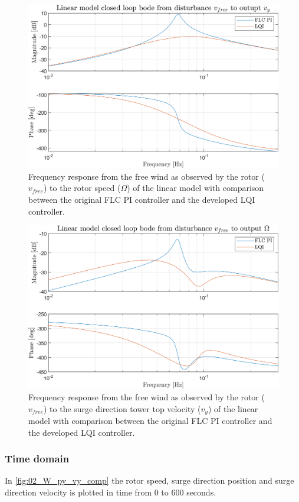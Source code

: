 \begin{figure}[ht]
	\centering
	\includegraphics[width=0.7\linewidth]{Graphics/TestResults/linearModPerf/10_vfreeTovy.png}
	\caption{Frequency response from the free wind as observed by the rotor ($ v_{free} $) to the rotor speed  ($ \Omega $) of the linear model with comparison between the original FLC PI controller and the developed LQI controller.}
	\label{fig:10_vfreeTovy}
\end{figure}

\begin{figure}[ht]
	\centering
	\includegraphics[width=0.7\linewidth]{Graphics/TestResults/linearModPerf/11_vfreeToW.png}
	\caption{Frequency response from the free wind as observed by the rotor ($ v_{free} $) to the surge direction tower top velocity ($ v_y $) of the linear model with comparison between the original FLC PI controller and the developed LQI controller.}
	\label{fig:11_vfreeToW}
\end{figure}

\clearpage
\subsubsection{Time domain}
In \cref{fig:02_W_py_vy_comp} the rotor speed, surge direction position and surge direction velocity is plotted in time from 0 to 600 seconds.

